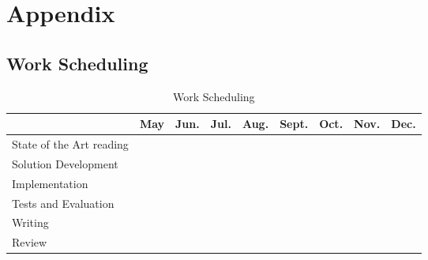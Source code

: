 
\section{Appendix} %
\label{sec:attachments}

\subsection{Work Scheduling} %
\label{sub:work_scheduling}

\begin{table}[H]
  \label{tab:worktable}
  \begin{center}
    \begin{tabular}{|l||c|c|c|c|c|c|c|c|}
    \hline & \textbf{May} & \textbf{Jun.} & \textbf{Jul.} & \textbf{Aug.} & \textbf{Sept.} & \textbf{Oct.} & \textbf{Nov.} & \textbf{Dec.}\\
    \hline
    \hline
      State of the Art reading & \cellcolor{black!25} & \cellcolor{black!25} &   &   &  & &  &  \\
    \hline
      Solution Development & \cellcolor{black!25} & \cellcolor{black!25} &   &   &   & &  &  \\
    \hline
      Implementation &  & \cellcolor{black!25} & \cellcolor{black!25} & \cellcolor{black!25} & \cellcolor{black!25} &  &   &  \\
    \hline
      Tests and Evaluation &  &  &   &  & \cellcolor{black!25} & \cellcolor{black!25} &  &  \\
    \hline
      Writing &  & \cellcolor{black!25} & \cellcolor{black!25} & \cellcolor{black!25}  & \cellcolor{black!25} & \cellcolor{black!25} & \cellcolor{black!25} & \cellcolor{black!25} \\
    \hline
      Review &  &  &  &  &  & & \cellcolor{black!25} & \cellcolor{black!25} \\
    \hline
    \end{tabular}
    \caption{Work Scheduling}
  \end{center}
\end{table}